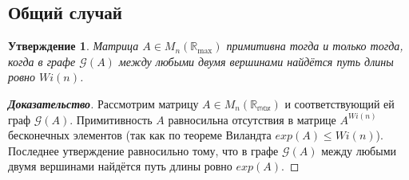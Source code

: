\documentclass[12pt]{article}
\newtheorem{proposition}[theorem]{Утверждение}
\begin{document}
\subsection{Общий случай}
\begin{proposition}
Матрица $A \in M_n(\mathbb{R}_{\max})$ примитивна тогда и только тогда, когда в графе $\mathcal{G}(A)$ между любыми двумя вершинами найдётся путь длины ровно $Wi(n)$.
\end{proposition}
\begin{proof}[\textbf{Доказательство}]
Рассмотрим матрицу $A \in M_n(\mathbb{R_{\max}})$ и соответствующий ей граф $\mathcal{G}(A)$. Примитивность $A$ равносильна отсутствия в матрице $A^{Wi(n)}$ бесконечных элементов (так как по теореме Виландта $exp(A) \leq Wi(n)$). Последнее утверждение равносильно тому, что в графе $\mathcal{G}(A)$ между любыми двумя вершинами найдётся путь длины ровно $exp(A)$.
\end{proof}
\end{document}
